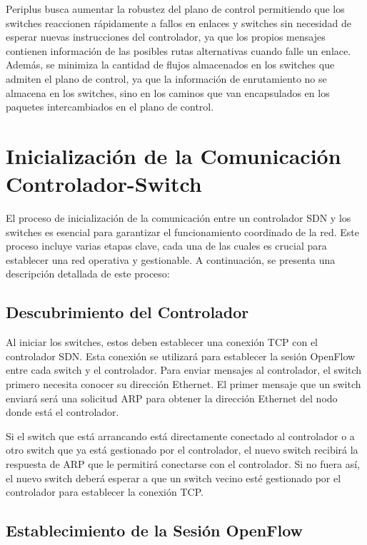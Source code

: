 \documentclass[a4paper, 12pt]{book}
\begin{document}
	Periplus busca aumentar la robustez del plano de control permitiendo que los switches reaccionen rápidamente a fallos en enlaces y switches sin necesidad de esperar nuevas instrucciones del controlador, ya que los propios mensajes contienen información de las posibles rutas alternativas cuando falle un enlace.
	Además, se minimiza la cantidad de flujos almacenados en los switches que admiten el plano de control, ya que la información de enrutamiento no se almacena en los switches, sino en los caminos que van encapsulados en los paquetes intercambiados en el plano de control.
	
	
	\section{Inicialización de la Comunicación Controlador-Switch}
	
	El proceso de inicialización de la comunicación entre un controlador SDN y los switches es esencial para garantizar el funcionamiento coordinado de la red. Este proceso incluye varias etapas clave, cada una de las cuales es crucial para establecer una red operativa y gestionable. A continuación, se presenta una descripción detallada de este proceso:
	
	\subsection{Descubrimiento del Controlador}
	
	Al iniciar los switches, estos deben establecer una conexión TCP con el controlador SDN. Esta conexión se utilizará para establecer la sesión OpenFlow entre cada switch y el controlador.
		Para enviar mensajes al controlador, el switch primero necesita conocer su dirección Ethernet. El primer mensaje que un switch enviará será una solicitud ARP para obtener la dirección Ethernet del nodo donde está el controlador.

	Si el switch que está arrancando está directamente conectado al controlador o a otro
	switch que ya está gestionado por el controlador, el nuevo switch recibirá la respuesta
	de ARP que le permitirá conectarse 	con el controlador. Si no fuera así, el nuevo switch
	deberá esperar 	a que un  switch vecino	esté gestionado	por el	controlador para establecer la conexión TCP.
	
	\subsection{Establecimiento de la Sesión OpenFlow}
	
\end{document}
